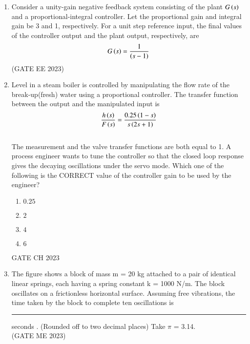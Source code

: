 \begin{enumerate}[label=\thechapter.\arabic*,ref=\thechapter.\theenumi]

\item Consider a unity-gain negative feedback system consisting of the plant $G\left(s\right)$  and a proportional-integral controller. Let the proportional gain and integral
gain be 3 and 1, respectively. For a unit step reference input, the final values of the
controller output and the plant output, respectively, are
\begin{align}
    G\left(s\right) = \frac{1}{\left(s-1\right)} \notag
\end{align}\hfill (GATE EE 2023)\\
\solution 

\newpage

\item Level  in a steam boiler is controlled by manipulating the flow rate  of the break-up(fresh) water using a proportional  controller. The transfer function between the output and the manipulated input is   \\
$$ \frac{h\left(s\right)}{F\left(s\right)}=\frac{0.25\left(1-s\right)}{s\left(2s+1\right)} $$   \\
The measurement and the valve transfer functions are both equal to 1. A process engineer wants to tune the controller so that the closed loop response gives the decaying oscillations under the servo mode. Which one of the following is the CORRECT value of the controller gain to be used by the engineer? \\
\begin{enumerate}[label=(\alph*)]
    \item $0.25$
    \item $2$
    \item $4$
    \item $6$
\end{enumerate} \hfill{GATE CH 2023} \\

\solution

\newpage
\item The figure shows a block of mass m = 20 kg attached to a pair of identical linear springs, each having a spring constant k = 1000 N/m. The block oscillates on a frictionless horizontal surface. Assuming free vibrations, the time taken by the block to complete ten oscillations is \rule{1cm}{0.15mm} seconds . (Rounded off to two decimal places) Take $\pi$ = 3.14. \\ \hfill(GATE ME 2023)


\end{enumerate}
